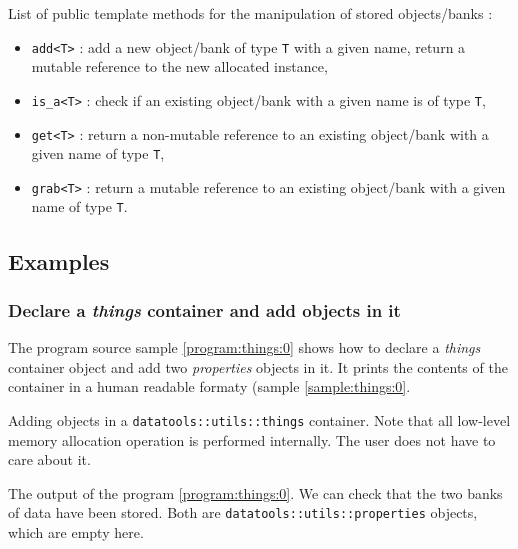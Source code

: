 \pn List  of public  template methods for  the manipulation  of stored
objects/banks :

\begin{itemize}

\item \texttt{add<T>} : add a new object/bank of type \texttt{T} with
  a given name, return a mutable reference to the new allocated instance,

\item \texttt{is\_a<T>} : check if an existing object/bank with a given 
  name is of type \texttt{T},

\item \texttt{get<T>} : return a non-mutable reference to an existing object/bank 
  with a given name of type \texttt{T},

\item \texttt{grab<T>} : return a mutable reference to an existing object/bank 
  with a given name of type \texttt{T}.

\end{itemize}

\subsection{Examples}

\subsubsection{Declare a \emph{things} container and add objects in it}

\pn The  program source sample  \ref{program:things:0} shows
how to declare a \emph{things} container object and add two \emph{properties}
objects in it. It prints
the  contents of  the container  in a  human readable  formaty (sample
\ref{sample:things:0}.

\begin{program}[h]
\caption{Adding objects in  a
  \texttt{datatools::utils::things} container. Note that all low-level
  memory allocation operation is performed internally. The user does not
  have to care about it.  
}
\label{program:things:0}
\end{program}



\begin{sample}[h]
\caption{The  output of the  program \ref{program:things:0}.
  We  can  check that  the  two banks of data  have been  stored. Both are
  \texttt{datatools::utils::properties} objects, which are empty here.
}
\label{sample:things:0}
\end{sample}


